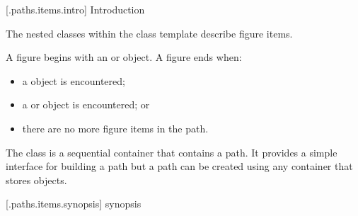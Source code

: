 
 [\iotwod.paths.items.intro] {Introduction}

\pnum
The nested classes within the class template  describe figure items.

\pnum
A figure begins with an  or  object. A figure ends when:

\begin{itemize}
\item a  object is encountered;
\item a  or  object is encountered; or
\item there are no more figure items in the path.
\end{itemize}

\pnum
The  class is a sequential container that contains a path. It provides a simple interface for building a path but a path can be created using any container that stores  objects.

 [\iotwod.paths.items.synopsis] { synopsis}

